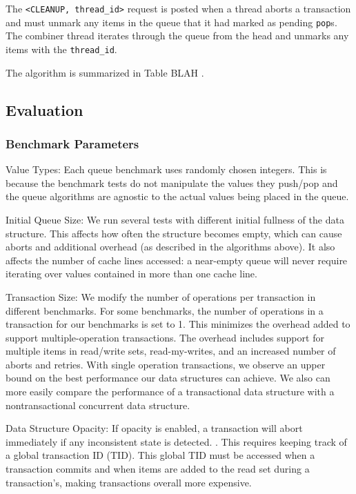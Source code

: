 The \texttt{<CLEANUP, thread\_id>} request is posted when a thread aborts a transaction and must unmark any items in the queue that it had marked as pending \texttt{pop}s. The combiner thread iterates through the queue from the head and unmarks any items with the \texttt{thread\_id}.

The algorithm is summarized in Table BLAH .
 
\subsection{Evaluation}

\subsubsection{Benchmark Parameters}
\begin{bullets}
\item Value Types: Each queue benchmark uses randomly chosen integers. This is because the benchmark tests do not manipulate the values they push/pop and the queue algorithms are agnostic to the actual values being placed in the queue.

\item Initial Queue Size: We run several tests with different initial fullness of the data structure. This affects how often the structure becomes empty, which can cause aborts and additional overhead (as described in the algorithms above). It also affects the number of cache lines accessed: a near-empty queue will never require iterating over values contained in more than one cache line.

\item Transaction Size: We modify the number of operations per transaction in different benchmarks. For some benchmarks, the number of operations in a transaction for our benchmarks is set to 1. This minimizes the overhead added to support multiple-operation transactions. The overhead includes support for multiple items in read/write sets, read-my-writes, and an increased number of aborts and retries. With single operation transactions, we observe an upper bound on the best performance our data structures can achieve. We also can more easily compare the performance of a transactional data structure with a nontransactional concurrent data structure.

\item Data Structure Opacity: If opacity is enabled, a transaction will abort immediately if any inconsistent state is detected. . This requires keeping track of a global transaction ID (TID). This global TID must be accessed when a transaction commits and when items are added to the read set during a transaction's, making transactions overall more expensive.
\end{bullets}

